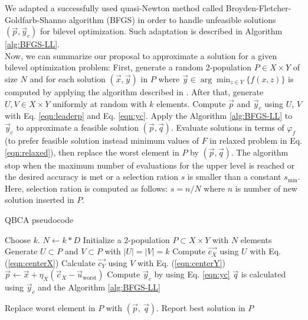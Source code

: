 \documentclass[conference]{IEEEtran}
\theoremstyle{definition}
\begin{document}
We adapted a successfully used quasi-Newton method called Broyden-Fletcher-Goldfarb-Shanno
algorithm (BFGS) \cite{fletcher2013practical} in order to handle unfeasible
solutions $(\vec{p}, \vec{y}_c)$ for bilevel optimization. Such adaptation is
described in Algorithm \ref{alg:BFGS-LL}. \\
% 


Now, we can summarize our proposal to approximate a solution for a given bilevel
optimization problem: First, generate a random 2-population $P \in X \times Y$ of
size $N$ and for each solution $(\vec{x}, \vec{y})$ in $P$ where $\vec{y} \in \arg \min_{z\in Y} \{ f(x,z)\}$
is computed by applying the algorithm described in \cite{Mejia2018}. After that, generate
$U, V \in X\times Y$ uniformly at random with $k$ elements. Compute $\vec{p}$ and
$\vec{y}_c$ using $U$, $V$ with Eq. \ref{eqn:leaderp} and Eq. \ref{eqn:yc}. Apply
the Algorithm \ref{alg:BFGS-LL} to $\vec{y}_c$ to approximate a feasible solution
$(\vec{p}, \vec{q})$. Evaluate solutions in terms of $\varphi_f$ (to prefer feasible
solution instead minimum values of $F$ in relaxed problem in Eq. \ref{eqn:relaxed}),
then replace the worst element in $P$ by $(\vec{p}, \vec{q})$. The algorithm
stop when the maximum number of evaluations for the upper level is reached or the
desired accuracy is met or a selection ration $s$ is smaller than a constant $s_{\min}$.
Here, selection ration is computed as follows: $ s = n /N$ where $n$ is number of
new solution inserted  in $P$.



\begin{algorithm}[!ht]
    \caption{QBCA pseudocode}
    \label{alg:QBCA}
    \begin{algorithmic}[1]
        \STATE Choose $k$.
        \STATE $N \gets k * D$
        \STATE Initialize a 2-population $P\subset X\times Y$ with $N$ elements
                \STATE Generate $U \subset P$ and $V \subset P$ with $|U| = |V| = k$
                \STATE Compute $\vec{c_X}$ using $U$ with Eq. (\ref{eqn:centerX})
                \STATE Calculate $\vec{c_Y}$ using $V$ with Eq. (\ref{eqn:centerY})
                \STATE $ \vec{p} \gets \vec{x} + \eta_{X} (\vec{c}_X - \vec{u}_{\text{worst}})$
                \STATE Compute $ \vec{y}_c $ by using Eq. \ref{eqn:yc}
                \STATE $ \vec{q} $ is calculated using $\vec{y}_c$ and the Algorithm \ref{alg:BFGS-LL}
                
                    \STATE Replace worst element in $P$ with $(\vec{p},\ \vec{q})$.
                \ENDIF
            \ENDFOR
        \ENDWHILE
        \STATE Report best solution in $P$
    \end{algorithmic}
\end{algorithm}
\end{document}
